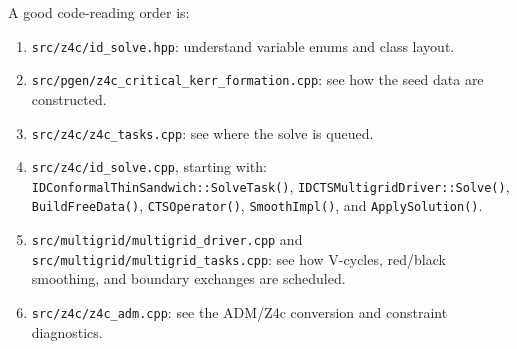 \documentclass[11pt]{article}
\newcommand{\file}[1]{\nolinkurl{#1}}
\newcommand{\code}[1]{\texttt{#1}}
\begin{document}
A good code-reading order is:
\begin{enumerate}
  \item \file{src/z4c/id\_solve.hpp}: understand variable enums and class layout.
  \item \file{src/pgen/z4c\_critical\_kerr\_formation.cpp}: see how the seed data
        are constructed.
  \item \file{src/z4c/z4c\_tasks.cpp}: see where the solve is queued.
  \item \file{src/z4c/id\_solve.cpp}, starting with:
        \code{IDConformalThinSandwich::SolveTask()},
        \code{IDCTSMultigridDriver::Solve()},
        \code{BuildFreeData()},
        \code{CTSOperator()},
        \code{SmoothImpl()}, and \code{ApplySolution()}.
  \item \file{src/multigrid/multigrid\_driver.cpp} and
        \file{src/multigrid/multigrid\_tasks.cpp}: see how V-cycles, red/black
        smoothing, and boundary exchanges are scheduled.
  \item \file{src/z4c/z4c\_adm.cpp}: see the ADM/Z4c conversion and constraint
        diagnostics.
\end{enumerate}
\end{document}
